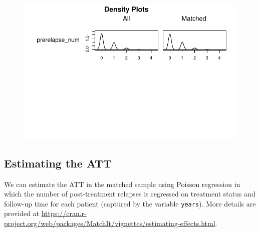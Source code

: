 \documentclass[
  letterpaper,
  DIV=11,
  numbers=noendperiod]{scrreprt}
\begin{document}
\begin{figure}[H]

{\centering \includegraphics{chapter_06_files/figure-pdf/unnamed-chunk-11-3.pdf}

}

\end{figure}

\hypertarget{estimating-the-att}{%
\subsection{Estimating the ATT}\label{estimating-the-att}}

We can estimate the ATT in the matched sample using Poisson regression
in which the number of post-treatment relapses is regressed on treatment
status and follow-up time for each patient (captured by the variable
\texttt{years}). More details are provided at
\url{https://cran.r-project.org/web/packages/MatchIt/vignettes/estimating-effects.html}.
\end{document}
